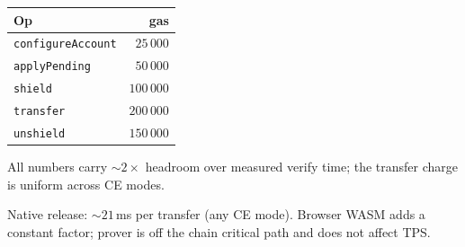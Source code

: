 %
\begin{center}
\begin{tabular}{@{}l r@{}}
  \toprule
  \textbf{Op} & \textbf{gas} \\
  \midrule
  \texttt{configureAccount} & $25\,000$  \\
  \texttt{applyPending}     & $50\,000$  \\
  \texttt{shield}           & $100\,000$ \\
  \texttt{transfer}         & $200\,000$ \\
  \texttt{unshield}         & $150\,000$ \\
  \bottomrule
\end{tabular}
\end{center}
%
All numbers carry $\sim 2\times$ headroom over measured verify time;
the transfer charge is uniform across CE modes.

Native release: $\sim 21$\,ms per transfer (any CE mode).
Browser WASM adds a constant factor; prover is off the chain critical
path and does not affect TPS.
